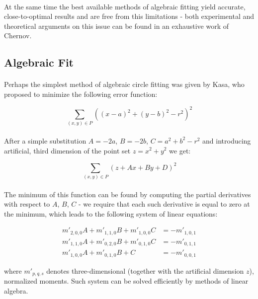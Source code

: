 \paragraph*{}
At the same time the best available methods of algebraic fitting yield accurate, close-to-optimal results and are free from this limitations - both experimental and theoretical arguments on this issue can be found in an exhaustive work\cite{Chernov10} of Chernov.

\subsection{Algebraic Fit}

\paragraph*{}
Perhaps the simplest method of algebraic circle fitting was given by Kasa, who proposed to minimize the following error function:

\[
	\sum_{(x,y) \in P} ((x-a)^2 + (y-b)^2 - r^2)^2
\]

\paragraph*{}
After a simple substitution $A = -2a$, $B = -2b$, $C = a^2 + b^2 - r^2$ and introducing artificial, third dimension of the point set $z = x^2 + y^2$ we get:

\[
	\sum_{(x,y) \in P} (z + Ax + By + D)^2
\]

\paragraph*{}
The minimum of this function can be found by computing the partial derivatives with respect to $A$, $B$, $C$ - we require that each such derivative is equal to zero at the minimum, which leads to the following system of linear equations:

\begin{align*}
	m'_{2,0,0}A + m'_{1,1,0}B + m'_{1,0,0}C &= -m'_{1,0,1}\\
	m'_{1,1,0}A + m'_{0,2,0}B + m'_{0,1,0}C &= -m'_{0,1,1}\\
	m'_{1,0,0}A + m'_{0,1,0}B + C &= -m'_{0,0,1}
\end{align*}

where $m'_{p,q,s}$ denotes three-dimensional (together with the artificial dimension $z$), normalized moments. Such system can be solved efficiently by methods of linear algebra.

